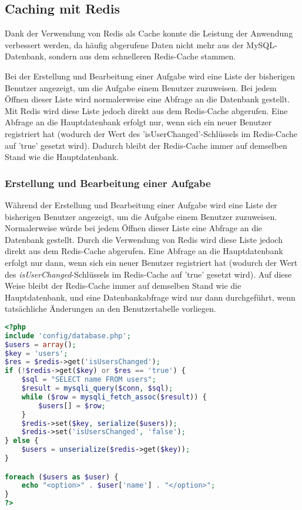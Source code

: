 \subsection{Caching mit Redis}

Dank der Verwendung von Redis als Cache konnte die Leistung der Anwendung verbessert werden, da häufig abgerufene Daten nicht mehr aus der MySQL-Datenbank, sondern aus dem schnelleren Redis-Cache stammen.

Bei der Erstellung und Bearbeitung einer Aufgabe wird eine Liste der bisherigen Benutzer angezeigt, um die Aufgabe einem Benutzer zuzuweisen. Bei jedem Öffnen dieser Liste wird normalerweise eine Abfrage an die Datenbank gestellt. Mit Redis wird diese Liste jedoch direkt aus dem Redis-Cache abgerufen. Eine Abfrage an die Hauptdatenbank erfolgt nur, wenn sich ein neuer Benutzer registriert hat (wodurch der Wert des 'isUserChanged'-Schlüssels im Redis-Cache auf 'true' gesetzt wird). Dadurch bleibt der Redis-Cache immer auf demselben Stand wie die Hauptdatenbank.

\subsubsection*{\centering Erstellung und Bearbeitung einer Aufgabe}
Während der Erstellung und Bearbeitung einer Aufgabe wird eine Liste der bisherigen Benutzer angezeigt, um die Aufgabe einem Benutzer zuzuweisen\cite{FRANCISNDUNGU2023}. Normalerweise würde bei jedem Öffnen dieser Liste eine Abfrage an die Datenbank gestellt. Durch die Verwendung von Redis wird diese Liste jedoch direkt aus dem Redis-Cache abgerufen. Eine Abfrage an die Hauptdatenbank erfolgt nur dann, wenn sich ein neuer Benutzer registriert hat (wodurch der Wert des \emph{isUserChanged}-Schlüssels im Redis-Cache auf 'true' gesetzt wird). Auf diese Weise bleibt der Redis-Cache immer auf demselben Stand wie die Hauptdatenbank, und eine Datenbankabfrage wird nur dann durchgeführt, wenn tatsächliche Änderungen an den Benutzertabelle vorliegen.

\begin{lstlisting}[language=PHP, caption=Caching von Benutzerdaten in redis]
<?php
include 'config/database.php';
$users = array();
$key = 'users';
$res = $redis->get('isUsersChanged');
if (!$redis->get($key) or $res == 'true') {
    $sql = "SELECT name FROM users";
    $result = mysqli_query($conn, $sql);
    while ($row = mysqli_fetch_assoc($result)) {
        $users[] = $row;
    }
    $redis->set($key, serialize($users));
    $redis->set('isUsersChanged', 'false');
} else {
    $users = unserialize($redis->get($key));
}

foreach ($users as $user) {
    echo "<option>" . $user['name'] . "</option>";
}
?>
\end{lstlisting}

